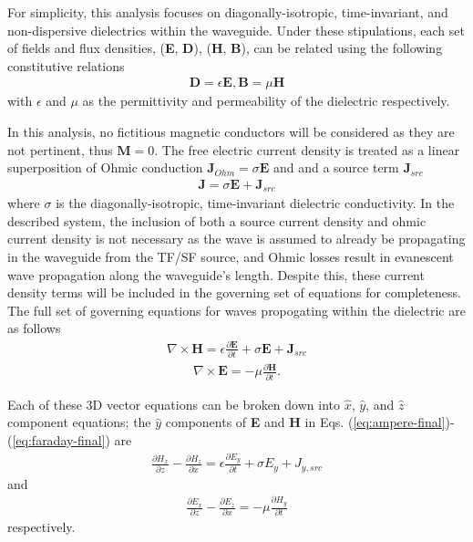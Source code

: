 For simplicity, this analysis focuses on diagonally-isotropic, time-invariant, and non-dispersive dielectrics within the waveguide. Under these stipulations, each set of fields and flux densities, (\textbf{E}, \textbf{D}), (\textbf{H}, \textbf{B}), can be related using the following constitutive relations
\begin{align}
	\textbf{D}=\epsilon\textbf{E}, \textbf{B}=\mu\textbf{H}
	\label{eq:cor}
\end{align}
with $\epsilon$ and $\mu$ as the permittivity and permeability of the dielectric respectively.

In this analysis, no fictitious magnetic conductors will be considered as they are not pertinent, thus $\textbf{M} = 0$. The free electric current density is treated as a linear superposition of Ohmic conduction $\textbf{J}_{Ohm}=\sigma\textbf{E}$ and and a source term $\textbf{J}_{src}$
\begin{align}
	\textbf{J} = \sigma\textbf{E} + \textbf{J}_{src}
	\label{eq:current}
\end{align}
where $\sigma$ is the diagonally-isotropic, time-invariant dielectric conductivity. In the described system, the inclusion of both a source current density and ohmic current density is not necessary as the wave is assumed to already be propagating in the waveguide from the TF/SF source, and Ohmic losses result in evanescent wave propagation along the waveguide's length. Despite this, these current density terms will be included in the governing set of equations for completeness. The full set of governing equations for waves propogating within the dielectric are as follows
\begin{align}
    \nabla\times\textbf{H} = \epsilon\frac{\partial\textbf{E}}{\partial t} + \sigma\textbf{E} + \textbf{J}_{src}
    \label{eq:ampere-final}
\end{align}
\begin{align}
    \nabla\times\textbf{E}=-\mu\frac{\partial\textbf{H}}{\partial t}.
    \label{eq:faraday-final}
\end{align}

Each of these 3D vector equations can be broken down into $\hat{x}$, $\hat{y}$, and $\hat{z}$ component equations; the $\hat{y}$ components of \textbf{E} and \textbf{H} in Eqs. (\ref{eq:ampere-final})-(\ref{eq:faraday-final}) are
\begin{align}
	\frac{\partial H_x}{\partial z} - \frac{\partial H_z}{\partial x} = \epsilon\frac{\partial E_y}{\partial t} + \sigma E_y + J_{y,src}
	\label{ampere-full-ey}
\end{align}
and
\begin{align}
	\frac{\partial E_x}{\partial z} - \frac{\partial E_z}{\partial x} =-\mu\frac{\partial H_y}{\partial t}
	\label{faraday-full-hy}
\end{align}
respectively.

